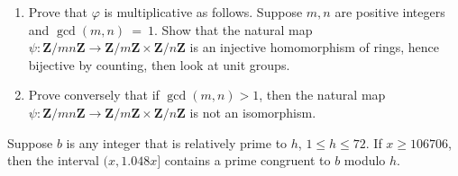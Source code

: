 \documentclass{exam}
\newcommand{\Z}{\mathbb Z}
\newcommand{\con}{\equiv}
\newcommand{\cross}{\times}
\newcommand{\ra}{\rightarrow}
\newcommand{\vphi}{\varphi}
\newcommand{\zmod}[1]{\Z/#1\Z{}}
\renewcommand{\mathbb}{\mathbf}
\begin{document}
\begin{questions}








	\question[15]\label{ex:multproof2}
	\begin{enumerate}
	\item Prove that $\vphi$ is multiplicative as follows.  Suppose $m,n$ are
	positive integers and $\gcd(m,n)~=~1$.  Show that
	the natural map $\psi:\zmod{mn} \ra \zmod{m} \cross \zmod{n}$ is
	an injective homomorphism of rings, hence bijective by counting, then
	look at unit groups.
	\item Prove conversely that if $\gcd(m,n)>1$, then
	the natural map $\psi:\zmod{mn} \ra \zmod{m} \cross \zmod{n}$
	is not an isomorphism.
	\end{enumerate}

	\question[40] Suppose $b$ is any integer that is relatively prime to $h$, $1 \leqslant h \leqslant 72$. If $x \geqslant 106706$, then the interval $(x, 1.048x]$ contains a prime congruent to $b$ modulo $h$.





\end{questions}
\end{document}
